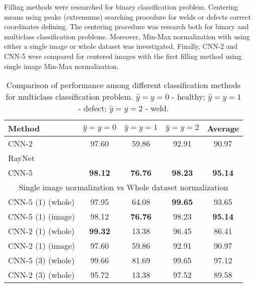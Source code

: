Filling methods were researched for binary classification problem.
Centering means using peaks (extremums) searching procedure for welds or defects correct coordinates defining.
The centering procedure was research both for binary and multiclass classification problems.
Moreover, Min-Max normalization with using either a single image or whole dataset was investigated.
Finally, CNN-2 and CNN-5 were compared for centered images with the first filling method using single image Min-Max normalization.

\begin{table}[!htb]
	\caption{\label{tab:comp2}Comparison of performance among different classification methods for multiclass classification problem. $\hat{y}=y=0$ - healthy; $\hat{y}=y=1$ - defect; $\hat{y}=y=2$ - weld.}
	\begin{center}
		\small
		\begin{tabular}{| l | c | c | c | c |}
			\hline
			Method & $\hat{y}=y=0$ & $\hat{y}=y=1$ & $\hat{y}=y=2$ & Average \\
			\hline
			CNN-2 & 97.60 & 59.86 & 92.91 & 90.97 \\
			RayNet &  &  &  &  \\
			CNN-5 & \textbf{98.12} & \textbf{76.76} & \textbf{98.23} & \textbf{95.14} \\
			\hline
			\multicolumn{5}{|c|}{Single image normalization vs Whole dataset normalization}  \\
			\hline
			CNN-5 (1) (whole) & 97.95 & 64.08 & \textbf{99.65} & 93.65 \\
			CNN-5 (1) (image) &  98.12 & \textbf{76.76} & 98.23 & \textbf{95.14} \\
			CNN-2 (1) (whole) & \textbf{99.32} & 13.38 & 96.45 & 86.41 \\
			CNN-2 (1) (image) & 97.60 & 59.86 & 92.91 & 90.97 \\
			CNN-5 (3) (whole) & 99.66 & 81.69 & 99.65 & 97.12 \\
			CNN-2 (3) (whole) & 95.72 & 13.38 & 97.52 & 89.58 \\
			\hline
		\end{tabular}
	\end{center}
\end{table}

